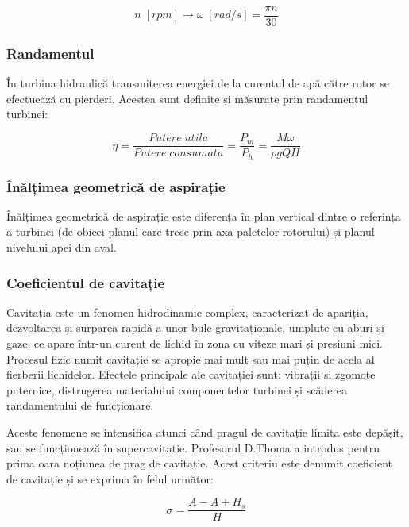 \begin{equation}
n\; [\si{rpm}]\rightarrow{\omega}\; [\si{rad/s}]=\frac{{\pi}n}{30}
\end{equation}


\subsubsection{Randamentul}

În turbina hidraulică transmiterea energiei de la curentul de apă către rotor se efectuează cu pierderi. Acestea sunt definite și măsurate prin randamentul turbinei:

\begin{equation}
{\eta}=\frac{Putere\; utila}{Putere\; consumata}=\frac{P_m}{P_h}=\frac{M{\omega}}{{\rho}gQH}
\end{equation}


\subsubsection{Înălțimea geometrică de aspirație}

Înălțimea geometrică de aspirație este diferența în plan vertical dintre o referința a turbinei (de obicei planul care trece prin axa paletelor rotorului) și planul nivelului apei din aval.

\subsubsection{Coeficientul de cavitație}

Cavitația este un fenomen hidrodinamic complex, caracterizat de apariția, dezvoltarea și surparea rapidă a unor bule gravitaționale, umplute cu aburi și gaze, ce apare într-un curent de lichid în zona cu viteze mari și presiuni mici. Procesul fizic numit cavitație se apropie mai mult sau mai puțin de acela al fierberii lichidelor. Efectele principale ale cavitației sunt: vibrații si zgomote puternice, distrugerea materialului componentelor turbinei și scăderea randamentului de funcționare.

Aceste fenomene se intensifica atunci când pragul de cavitație limita este depășit, sau se funcționează în supercavitatie. Profesorul D.Thoma a introdus pentru prima oara noțiunea de prag de cavitație. Acest criteriu este denumit coeficient de cavitație și se exprima în felul următor:

\begin{equation}
\sigma=\frac{A-A\pm{H_s}}{H}
\end{equation}


